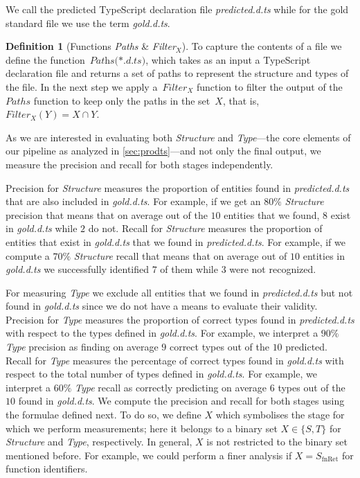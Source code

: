 \documentclass[sigplan,10pt,anonymous]{acmart} %
\theoremstyle{plain}
\theoremstyle{remark}
\theoremstyle{definition}
\newtheorem{defn}{Definition}[section]
\begin{document}
We call the predicted TypeScript declaration file
\emph{predicted.d.ts} while for the gold standard file we use the term
\emph{gold.d.ts}.

\begin{defn}[Functions \textit{Paths} \& \textit{Filter$_X$}]
  To capture the contents of a file we define the
  function~$\textit{Paths(*.d.ts)}$, which takes as an input a
  TypeScript declaration file and returns a set of paths
  to represent the structure and types of the file.
  In the next step we apply a~$Filter_X$ function to
  filter the output of the~$Paths$ function to keep only the paths in the set~$X$,
  that is,~$Filter_X(Y) =  X \cap Y$.
\end{defn}

As we are interested in evaluating both \textit{Structure} and \textit{Type}---the core elements of our pipeline as analyzed in \cref{sec:prodts}---and not only the final output, we measure the precision and recall for both stages independently.

Precision for \textit{Structure} measures the proportion of entities found in \textit{predicted.d.ts} that are also included in \textit{gold.d.ts}.
For example, if we get an $80\%$ \textit{Structure} precision that means that on average out of the $10$ entities that we found, $8$ exist in \textit{gold.d.ts} while $2$ do not.
Recall for \textit{Structure} measures the proportion of entities that exist in \textit{gold.d.ts} that we found in \textit{predicted.d.ts}.
For example, if we compute a $70\%$ \textit{Structure} recall that means that on average out of $10$ entities in \textit{gold.d.ts} we successfully identified $7$ of them while $3$ were not recognized.

For measuring \textit{Type} we exclude all entities that we found in \textit{predicted.d.ts} but not found in \textit{gold.d.ts} since we do not have a means to evaluate their validity.
Precision for \textit{Type} measures the proportion of correct types found in \textit{predicted.d.ts} with respect to the types defined in \textit{gold.d.ts}.
For example, we interpret a $90\%$ \textit{Type} precision as finding on average $9$ correct types out of the $10$ predicted.
Recall for \textit{Type} measures the percentage of correct types found in \textit{gold.d.ts} with respect to the total number of types defined in \textit{gold.d.ts}.
For example, we interpret a $60\%$ \textit{Type} recall as correctly predicting on average $6$ types out of the $10$ found in \textit{gold.d.ts}.
We compute the precision and recall for both stages using the formulae defined next.
To do so, we define $X$ which symbolises the stage for which we perform measurements; here it belongs to a binary set $X \in \{S, T\}$ for \textit{Structure} and \textit{Type}, respectively.
In general, $X$ is not restricted to the binary set mentioned before.
For example, we could perform a finer analysis if $X = S_\text{fnRet}$ for function identifiers.
\end{document}
